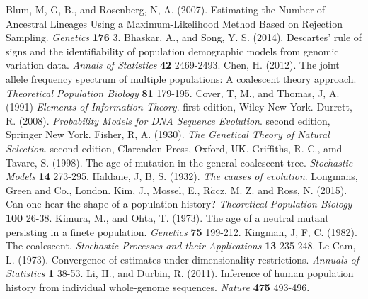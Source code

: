 \documentclass[12pt, a4paper,twoside]{report}
\theoremstyle{definition}
\theoremstyle{myplain}
\theoremstyle{mypro}
\begin{document}
\begin{thebibliography}{10}
Blum, M, G, B., and Rosenberg, N, A. (2007). Estimating the Number of Ancestral Lineages Using a Maximum-Likelihood Method Based on Rejection Sampling. \textit{Genetics} \textbf{176} 3.
Bhaskar, A., and Song, Y. S. (2014). Descartes' rule of signs and the identifiability of population demographic models from genomic variation data. \textit{Annals of Statistics} \textbf{42} 2469-2493.
Chen, H. (2012). The joint allele frequency spectrum of multiple populations: A coalescent theory approach. \textit{Theoretical Population Biology} \textbf{81} 179-195.
Cover, T, M., and Thomas, J, A. (1991) \textit{Elements of Information Theory}. first edition, Wiley New York.
Durrett, R. (2008). \textit{Probability Models for DNA Sequence Evolution}. second edition,  Springer New York.
Fisher, R, A. (1930). \textit{The Genetical Theory of Natural Selection}. second edition,  Clarendon Press, Oxford, UK.
Griffiths, R. C., amd Tavare, S. (1998). The age of mutation in the general coalescent tree. \textit{Stochastic Models} \textbf{14} 273-295.
Haldane, J, B, S. (1932). \textit{The causes of evolution}. Longmans, Green and Co., London.
Kim, J., Mossel, E., R$\acute{a}$cz, M. Z. and Ross, N. (2015). Can one hear the shape of a population history? \textit{Theoretical Population Biology} \textbf{100} 26-38.
Kimura, M., and Ohta, T. (1973). The age of a neutral mutant persisting in a finete population. \textit{Genetics} \textbf{75} 199-212.
Kingman, J, F, C. (1982). The coalescent. \textit{Stochastic Processes and their Applications} \textbf{13} 235-248.
Le Cam, L. (1973). Convergence of estimates under dimensionality restrictions. \textit{Annuals of Statistics} \textbf{1} 38-53.
Li, H., and Durbin, R. (2011). Inference of human population history from individual whole-genome sequences. \textit{Nature} \textbf{475} 493-496.

\end{thebibliography}
\end{document}
